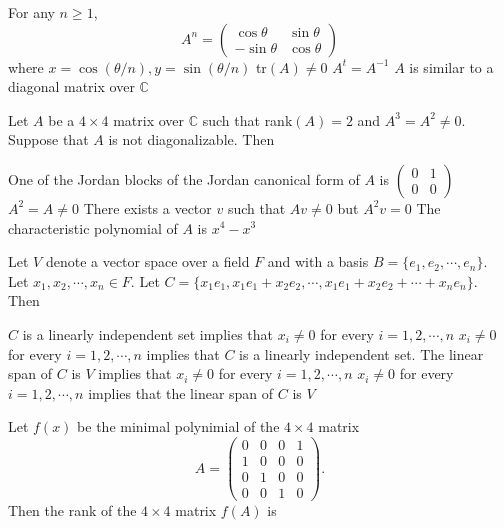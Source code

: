 \documentclass[10pt]{exam}
\begin{document}
\begin{questions}
\begin{checkboxes}
\choice For any $n \geq 1$,
$$ A^n = \begin{pmatrix} \cos \theta  & \sin \theta  \\ - \sin \theta  & \cos \theta  \end{pmatrix}$$ 
where $x = \cos (\theta /n), y = \sin (\theta /n)$
\choice tr$(A) \neq 0 $ 
\choice $A^t = A^{-1}$
\choice $A$ is similar to a diagonal matrix over $\mathbb{C}$
\end{checkboxes}


\question 
Let $A$ be a $4 \times 4$ matrix over $ \mathbb{C}$ such that rank$(A) = 2$ and $A^3 = A^2 \neq 0$. Suppose that $A$ is not diagonalizable. Then 

\begin{checkboxes}
\choice One of the Jordan blocks of the Jordan canonical form of $A$ is $\begin{pmatrix} 0 & 1 \\ 0 & 0 \end{pmatrix}$
\choice $A^2 = A \neq 0 $ 
\choice There exists a vector $v$ such that $Av \neq 0$ but $A^2 v = 0$ 
\choice The characteristic polynomial of $A$ is $x^4 - x^3$
\end{checkboxes}

\question 
Let $V$ denote a vector space over a field $F$ and with a basis $B = \{e_1, e_2, \cdots , e_n\}$. Let $x_1, x_2, \cdots ,x_n \in F $. Let $C = \{x_1e_1, x_1e_1 + x_2e_2, \cdots , x_1e_1 + x_2e_2 + \cdots +x_n e_n \}$. Then 

\begin{checkboxes}
\choice $C$ is a linearly independent set implies that $x_i \neq 0$ for every $ i = 1, 2, \cdots , n $ 
\choice  $x_i \neq 0$ for every $ i = 1, 2, \cdots , n$ implies that $C$ is a linearly independent set.
\choice The linear span of $C$ is $V$ implies that  $x_i \neq 0$ for every $ i = 1, 2, \cdots , n $ 
\choice  $x_i \neq 0$ for every $ i = 1, 2, \cdots , n $  implies that the linear span of $C$ is $V$ 
\end{checkboxes}

\question
Let $f(x)$ be the minimal polynimial of the $4\times 4$ matrix 
$$A=\begin{pmatrix}
0 & 0 & 0 & 1 \\ 
1 & 0 & 0 & 0 \\ 
0 & 1 & 0 & 0 \\ 
0 & 0 & 1 & 0
\end{pmatrix}. $$
Then the rank of the $4\times 4$ matrix $f(A)$ is 


\end{questions}
\end{document}
